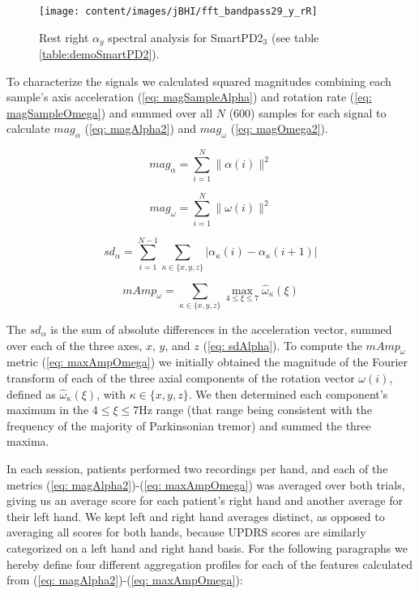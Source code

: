 \begin{figure}[h]
	\centering
	\texttt{[image: content/images/jBHI/fft\_bandpass29\_y\_rR]}
	\caption{Rest right $\alpha_{y}$ spectral analysis for \gls{SmartPD2}$_{3}$ (see table \ref{table:demoSmartPD2}).}
	\label{fig:accelFFTPD2_3}
\end{figure}

\noindent
To characterize the signals we calculated squared magnitudes combining each sample's axis acceleration (\ref{eq: magSampleAlpha}) and rotation rate (\ref{eq: magSampleOmega}) and summed over all $N$ (600) samples for each signal to calculate $mag_{\alpha}$ (\ref{eq: magAlpha2}) and $mag_{\omega}$ (\ref{eq: magOmega2}).


\begin{equation} \label{eq: magAlpha2}
mag_{\alpha} = \sum_{i=1}^{N} \|\alpha(i)\|^{2}
\end{equation}

\begin{equation} \label{eq: magOmega2}
mag_{\omega} = \sum_{i=1}^{N} \|\omega(i)\|^{2}
\end{equation}

\begin{equation} \label{eq: sdAlpha}
sd_{\alpha} = \sum_{i=1}^{N-1}\sum_{\kappa \in \{x,y,z\}} |\alpha_{\kappa}(i) - \alpha_{\kappa}(i+1)|
\end{equation}

\begin{equation} \label{eq: maxAmpOmega}
mAmp_{\omega} = \sum_{\kappa \in \{x,y,z\}} \max_{4 \leq \xi \leq 7} \hat{\omega}_{\kappa}(\xi)
\end{equation}

\noindent
The $sd_{\alpha}$ is the sum of absolute differences in the acceleration vector, summed over each of the three axes, $x$, $y$, and $z$ (\ref{eq: sdAlpha}). To compute the $mAmp_{\omega}$ metric (\ref{eq: maxAmpOmega}) we initially obtained the magnitude of the Fourier transform of each of the three axial components of the rotation vector $\omega(i)$, defined as $\hat{\omega}_{\kappa}(\xi)$, with $\kappa \in \{x,y,z\}$. We then determined each component’s maximum in the $4 \leq \xi \leq 7$Hz range (that range being consistent with the frequency of the majority of Parkinsonian tremor) and summed the three maxima. 

In each session, patients performed two recordings per hand, and each of the metrics (\ref{eq: magAlpha2})-(\ref{eq: maxAmpOmega}) was averaged over both trials, giving us an average score for each patient's right hand and another average for their left hand. We kept left and right hand averages distinct, as opposed to averaging all scores for both hands, because \gls{UPDRS} scores are similarly categorized on a left hand and right hand basis. For the following paragraphs we hereby define four different aggregation profiles for each of the features calculated from (\ref{eq: magAlpha2})-(\ref{eq: maxAmpOmega}):

